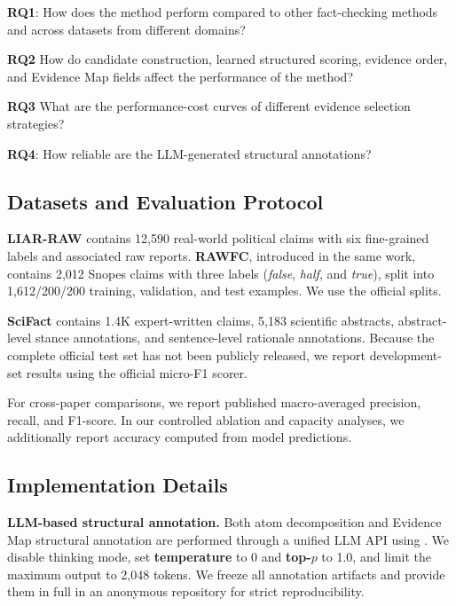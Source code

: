 \documentclass[letterpaper]{article}
\begin{document}
\textbf{RQ1}: How does the method perform compared to other fact-checking methods and across datasets from different domains?

\textbf{RQ2} How do candidate construction, learned structured scoring, evidence order, and Evidence Map fields affect the performance of the method?

\textbf{RQ3} What are the performance-cost curves of different evidence selection strategies?

\textbf{RQ4}: How reliable are the LLM-generated structural annotations?

\subsection{Datasets and Evaluation Protocol}

\textbf{LIAR-RAW} \citep{Yang2022CofCED} contains
12,590 real-world political claims with six fine-grained
labels and associated raw reports.
\textbf{RAWFC}, introduced in the same work, contains
2,012 Snopes claims with three labels
(\textit{false}, \textit{half}, and \textit{true}), split into
1,612/200/200 training, validation, and test examples.
We use the official splits. 

\textbf{SciFact} \citep{Wadden2020SciFact} contains
1.4K expert-written claims, 5,183 scientific abstracts,
abstract-level stance annotations, and sentence-level
rationale annotations. Because the complete official test
set has not been publicly released, we report development-set
results using the official micro-F1 scorer.

For cross-paper comparisons, we report published
macro-averaged precision, recall, and F1-score. In our
controlled ablation and capacity analyses, we additionally
report accuracy computed from model predictions.

\subsection{Implementation Details}

\textbf{LLM-based structural annotation.} Both atom decomposition and Evidence Map structural annotation are performed through a unified LLM API using \texttt{} \citep{DeepSeekAI2026V4}. We disable thinking mode, set \textbf{temperature} to 0 and \textbf{top-$p$} to 1.0, and limit the maximum output to 2,048 tokens. We freeze all annotation artifacts and provide them in full in an anonymous repository for strict reproducibility.
\end{document}

